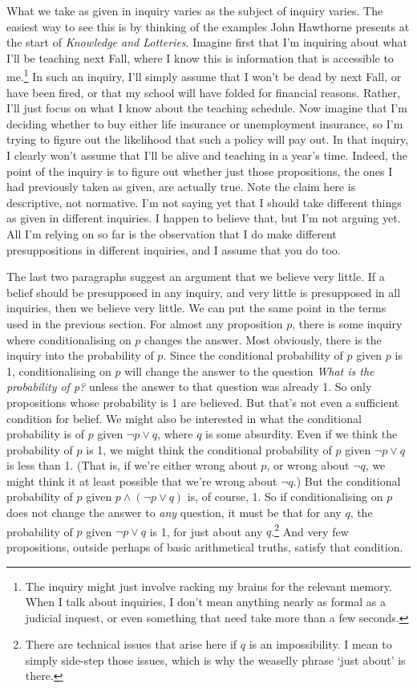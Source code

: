 What we take as given in inquiry varies as the subject of inquiry varies. The easiest way to see this is by thinking of the examples John Hawthorne presents at the start of \citeauthor{Hawthorne2004} \textit{Knowledge and Lotteries}. Imagine first that I'm inquiring about what I'll be teaching next Fall, where I know this is information that is accessible to me.\footnote{The inquiry might just involve racking my brains for the relevant memory. When I talk about inquiries, I don't mean anything nearly as formal as a judicial inquest, or even something that need take more than a few seconds.} In such an inquiry, I'll simply assume that I won't be dead by next Fall, or have been fired, or that my school will have folded for financial reasons. Rather, I'll just focus on what I know about the teaching schedule. Now imagine that I'm deciding whether to buy either life insurance or unemployment insurance, so I'm trying to figure out the likelihood that such a policy will pay out. In that inquiry, I clearly won't assume that I'll be alive and teaching in a year's time. Indeed, the point of the inquiry is to figure out whether just those propositions, the ones I had previously taken as given, are actually true. Note the claim here is descriptive, not normative. I'm not saying yet that I should take different things as given in different inquiries. I happen to believe that, but I'm not arguing yet. All I'm relying on so far is the observation that I do make different presuppositions in different inquiries, and I assume that you do too.

The last two paragraphs suggest an argument that we believe very little. If a belief should be presupposed in any inquiry, and very little is presupposed in all inquiries, then we believe very little. We can put the same point in the terms used in the previous section. For almost any proposition \(p\), there is some inquiry where conditionalising on \(p\) changes the answer. Most obviously, there is the inquiry into the probability of \(p\). Since the conditional probability of \(p\) given \(p\) is 1, conditionalising on \(p\) will change the answer to the question \textit{What is the probability of p?} unless the answer to that question was already 1. So only propositions whose probability is 1 are believed. But that's not even a sufficient condition for belief. We might also be interested in what the conditional probability is of \(p\) given \(\neg p \vee q\), where \(q\) is some absurdity. Even if we think the probability of \(p\) is 1, we might think the conditional probability of \(p\) given \(\neg p \vee q\) is less than 1. (That is, if we're either wrong about \(p\), or wrong about \(\neg q\), we might think it at least possible that we're wrong about \(\neg q\).) But the conditional probability of \(p\) given \(p \wedge (\neg p \vee q)\) is, of course, 1. So if conditionalising on \(p\) does not change the answer to \textit{any} question, it must be that for any \(q\), the probability of \(p\) given \(\neg p \vee q\) is 1, for just about any \(q\).\footnote{There are technical issues that arise here if \(q\) is an impossibility. I mean to simply side-step those issues, which is why the weaselly phrase `just about' is there.} And very few propositions, outside perhaps of basic arithmetical truths, satisfy that condition.

